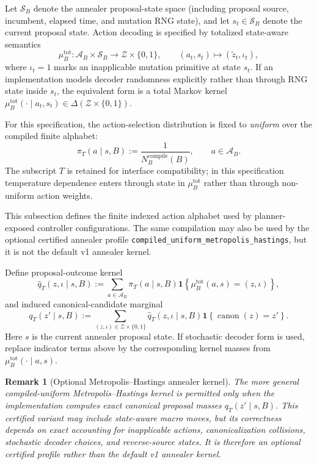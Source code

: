 \documentclass[11pt]{article}
\newtheorem{remark}{Remark}
\begin{document}
Let $\mathcal{S}_B$ denote the annealer proposal-state space (including
proposal source, incumbent, elapsed time, and mutation RNG state), and let
$s_t\in\mathcal{S}_B$ denote the current proposal state. Action decoding is
specified by totalized state-aware semantics
\[
\mu_B^{\mathrm{tot}}:\mathcal{A}_B\times\mathcal{S}_B\to\mathcal{Z}\times\{0,1\},
\qquad
(a_t,s_t)\mapsto(\tilde z_t,\iota_t),
\]
where $\iota_t=1$ marks an inapplicable mutation primitive at state $s_t$.
If an implementation models decoder randomness explicitly rather than through
RNG state inside $s_t$, the equivalent form is a total Markov kernel
$\mu_B^{\mathrm{tot}}(\cdot\mid a_t,s_t)\in\Delta(\mathcal{Z}\times\{0,1\})$.

For this specification, the action-selection distribution is fixed to
\emph{uniform} over the compiled finite alphabet:
\[
\pi_T(a\mid s,B):=\frac{1}{N_B^{\mathrm{compile}}(B)},
\qquad
a\in\mathcal{A}_B.
\]
The subscript $T$ is retained for interface compatibility; in this
specification temperature dependence enters through state in
$\mu_B^{\mathrm{tot}}$ rather than through non-uniform action weights.

This subsection defines the finite indexed action alphabet used by
planner-exposed controller configurations. The same compilation may also be
used by the optional certified annealer profile
\texttt{compiled\_uniform\_metropolis\_hastings}, but it is not the default
v1 annealer kernel.

Define proposal-outcome kernel
\[
\widehat q_T(z,\iota\mid s,B)
:=
\sum_{a\in\mathcal{A}_B}
\pi_T(a\mid s,B)
\mathbf{1}\!\left\{\mu_B^{\mathrm{tot}}(a,s)=(z,\iota)\right\},
\]
and induced canonical-candidate marginal
\[
q_T(z'\mid s,B)
:=
\sum_{(z,\iota)\in\mathcal{Z}\times\{0,1\}}
\widehat q_T(z,\iota\mid s,B)
\mathbf{1}\!\left\{\operatorname{canon}(z)=z'\right\}.
\]
Here $s$ is the current annealer proposal state.
If stochastic decoder form is used, replace indicator terms above by the
corresponding kernel masses from $\mu_B^{\mathrm{tot}}(\cdot\mid a,s)$.

\begin{remark}[Optional Metropolis--Hastings annealer kernel]
The more general compiled-uniform Metropolis--Hastings kernel is permitted
only when the implementation computes exact canonical proposal masses
$q_T(z'\mid s,B)$. This certified variant may include state-aware macro moves,
but its correctness depends on exact accounting for inapplicable actions,
canonicalization collisions, stochastic decoder choices, and reverse-source
states. It is therefore an optional certified profile rather than the default
v1 annealer kernel.
\end{remark}
\end{document}
